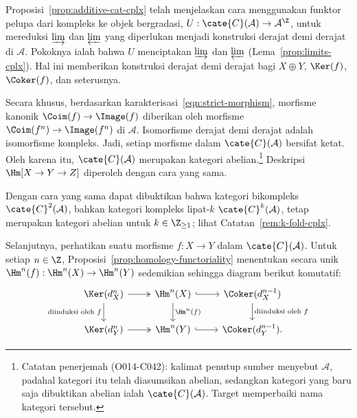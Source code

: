 \begin{bukti}
	Proposisi~\ref{prop:additive-cat-cplx} telah menjelaskan cara menggunakan
	funktor pelupa dari kompleks ke objek bergradasi,
	$U:\cate{C}(\mathcal{A})\to\mathcal{A}^{\Z}$, untuk mereduksi
	$\varinjlim$ dan $\varprojlim$ yang diperlukan menjadi konstruksi derajat
	demi derajat di $\mathcal{A}$. Pokoknya ialah bahwa $U$ menciptakan
	$\varinjlim$ dan $\varprojlim$ (Lema~\ref{prop:limits-cplx}). Hal ini
	memberikan konstruksi derajat demi derajat bagi $X\oplus Y$, $\Ker(f)$,
	$\Coker(f)$, dan seterusnya.

	Secara khusus, berdasarkan karakterisasi~\eqref{eqn:strict-morphism},
	morfisme kanonik $\Coim(f)\to\Image(f)$ diberikan oleh morfisme
	$\Coim(f^n)\to\Image(f^n)$ di $\mathcal{A}$. Isomorfisme derajat demi
	derajat adalah isomorfisme kompleks. Jadi, setiap morfisme dalam
	$\cate{C}(\mathcal{A})$ bersifat ketat. Oleh karena itu,
	$\cate{C}(\mathcal{A})$ merupakan kategori abelian.\footnote{Catatan
	penerjemah (O014-C042): kalimat penutup sumber menyebut $\mathcal{A}$,
	padahal kategori itu telah diasumsikan abelian, sedangkan kategori yang baru
	saja dibuktikan abelian ialah $\cate{C}(\mathcal{A})$. Target memperbaiki nama kategori
	tersebut.} Deskripsi $\Hm[X\to Y\to Z]$ diperoleh dengan cara yang sama.
\end{bukti}

\begin{catatan}
	Dengan cara yang sama dapat dibuktikan bahwa kategori bikompleks
	$\cate{C}^2(\mathcal{A})$, bahkan kategori kompleks lipat-$k$
	$\cate{C}^k(\mathcal{A})$, tetap merupakan kategori abelian untuk
	$k\in\Z_{\geq 1}$; lihat Catatan~\ref{rem:k-fold-cplx}.
\end{catatan}

Selanjutnya, perhatikan suatu morfisme $f:X\to Y$ dalam
$\cate{C}(\mathcal{A})$. Untuk setiap $n\in\Z$,
Proposisi~\ref{prop:homology-functoriality} menentukan secara unik
$\Hm^n(f):\Hm^n(X)\to\Hm^n(Y)$ sedemikian sehingga diagram berikut komutatif:
\begin{equation}\label{eqn:induced-morphism-cohomology}\begin{tikzcd}
	\Ker(d_X^n) \arrow[twoheadrightarrow, r] \arrow[d, "\text{diinduksi oleh $f$}"'] & \Hm^n(X) \arrow[hookrightarrow, r] \arrow[d, "{\Hm^n(f)}"] & \Coker(d_X^{n-1}) \arrow[d, "\text{diinduksi oleh $f$}"] \\
	\Ker(d_Y^n) \arrow[twoheadrightarrow, r] & \Hm^n(Y) \arrow[hookrightarrow, r] & \Coker(d_Y^{n-1}) .
\end{tikzcd}\end{equation}

